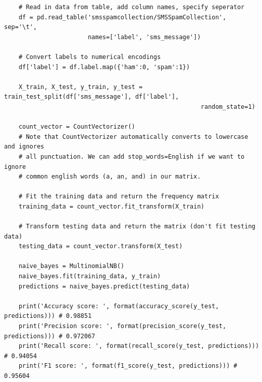 \documentclass[11pt, a4paper]{article}
\begin{document}
\begin{spacing}{1.1}
\begin{lstlisting}
	# Read in data from table, add column names, specify seperator
	df = pd.read_table('smsspamcollection/SMSSpamCollection', sep='\t', 
	                   names=['label', 'sms_message'])
	
	# Convert labels to numerical encodings
	df['label'] = df.label.map({'ham':0, 'spam':1})
	
	X_train, X_test, y_train, y_test = train_test_split(df['sms_message'], df['label'], 
                                                      random_state=1)
	
	count_vector = CountVectorizer()
	# Note that CountVectorizer automatically converts to lowercase and ignores
	# all punctuation. We can add stop_words=English if we want to ignore
	# common english words (a, an, and) in our matrix.
	
	# Fit the training data and return the frequency matrix
	training_data = count_vector.fit_transform(X_train)
	
	# Transform testing data and return the matrix (don't fit testing data)
	testing_data = count_vector.transform(X_test)
	
	naive_bayes = MultinomialNB()
	naive_bayes.fit(training_data, y_train)
	predictions = naive_bayes.predict(testing_data)
	
	print('Accuracy score: ', format(accuracy_score(y_test, predictions))) # 0.98851
	print('Precision score: ', format(precision_score(y_test, predictions))) # 0.972067
	print('Recall score: ', format(recall_score(y_test, predictions))) # 0.94054
	print('F1 score: ', format(f1_score(y_test, predictions))) # 0.95604 \end{lstlisting} \newpage


\end{spacing}
\end{document}
